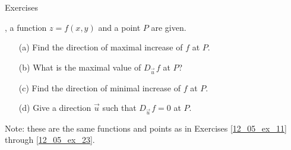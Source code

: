 {\noindent Exercises}
{, a function $z=f(x,y)$ and a point $P$ are given. 
\begin{enumerate}
	\item [(a)] Find the direction of maximal increase of $f$ at $P$.
	\item [(b)] What is the maximal value of $D_{\vec u\,}f$ at $P$?
	\item [(c)] Find the direction of minimal increase of $f$ at $P$.
	\item	[(d)] Give a direction $\vec u$ such that $D_{\vec u\,}f=0$ at $P$.
\end{enumerate}
Note: these are the same functions and points as in Exercises \ref{12_05_ex_11} through \ref{12_05_ex_23}.
}
